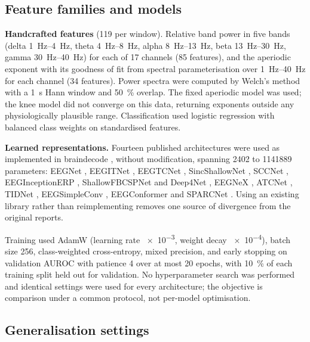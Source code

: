 \documentclass[11pt,a4paper]{article}
\begin{document}
\subsection{Feature families and models}

\textbf{Handcrafted features} (119 per window). Relative band power in five
bands (delta \SIrange{1}{4}{\hertz}, theta \SIrange{4}{8}{\hertz}, alpha
\SIrange{8}{13}{\hertz}, beta \SIrange{13}{30}{\hertz}, gamma
\SIrange{30}{40}{\hertz}) for each of 17 channels (85 features), and the
aperiodic exponent with its goodness of fit from spectral parameterisation
\citep{donoghue2020} over \SIrange{1}{40}{\hertz} for each channel (34
features). Power spectra were computed by Welch's method with a
\SI{1}{\second} Hann window and \SI{50}{\percent} overlap. The fixed aperiodic
model was used; the knee model did not converge on this data, returning
exponents outside any physiologically plausible range. Classification used
logistic regression with balanced class weights on standardised features.

\textbf{Learned representations.} Fourteen published architectures were used
as implemented in braindecode \citep{schirrmeister2017}, without modification,
spanning \num{2402} to \num{1141889} parameters: EEGNet \citep{lawhern2018},
EEGITNet \citep{salami2022}, EEGTCNet \citep{ingolfsson2020}, SincShallowNet
\citep{borra2020}, SCCNet \citep{wei2019}, EEGInceptionERP
\citep{santamaria2020}, ShallowFBCSPNet and Deep4Net
\citep{schirrmeister2017}, EEGNeX \citep{chen2024}, ATCNet
\citep{altaheri2022}, TIDNet \citep{kostas2020}, EEGSimpleConv
\citep{ouahidi2023}, EEGConformer \citep{song2022} and SPARCNet
\citep{jing2023}. Using an existing library rather than reimplementing removes
one source of divergence from the original reports.

Training used AdamW (learning rate \num{e-3}, weight decay \num{e-4}), batch
size 256, class-weighted cross-entropy, mixed precision, and early stopping on
validation AUROC with patience 4 over at most 20 epochs, with
\SI{10}{\percent} of each training split held out for validation. No
hyperparameter search was performed and identical settings were used for every
architecture; the objective is comparison under a common protocol, not
per-model optimisation.

\subsection{Generalisation settings}
\end{document}
